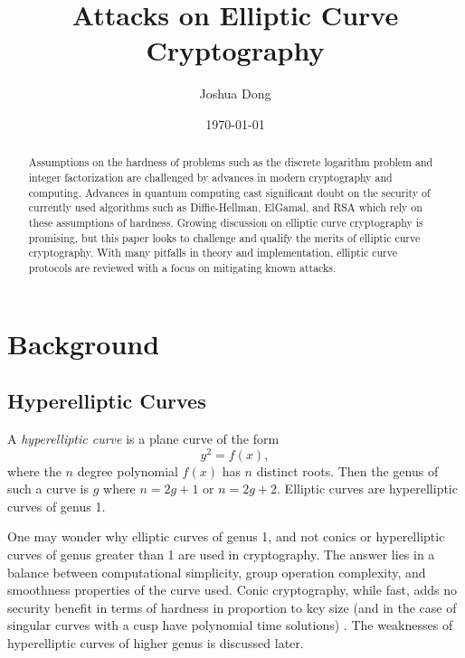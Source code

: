 \documentclass{article}
\begin{document}
\title{Attacks on Elliptic Curve Cryptography}
\author{Joshua Dong}
\date{\today}
\maketitle

\begin{abstract}
    Assumptions on the hardness of problems such as the discrete logarithm
    problem and integer factorization are challenged by advances in modern
    cryptography and computing. Advances in quantum computing cast significant
    doubt on the security of currently used algorithms such as Diffie-Hellman,
    ElGamal, and RSA which rely on these assumptions of hardness. Growing
    discussion on elliptic curve cryptography is promising, but this paper
    looks to challenge and qualify the merits of elliptic curve cryptography.
    With many pitfalls in theory and implementation, elliptic curve protocols
    are reviewed with a focus on mitigating known attacks.
\end{abstract}
 

\section{Background}
\subsection{Hyperelliptic Curves}
    A \textit{hyperelliptic curve} is a plane curve of the form
    \begin{equation}
        y^2 = f(x),
    \end{equation}
    where the $n$ degree polynomial $f(x)$ has $n$ distinct roots. Then the
    genus of such a curve is $g$ where $n = 2g + 1$ or $n = 2g + 2$. Elliptic
    curves are hyperelliptic curves of genus 1.

    One may wonder why elliptic curves of genus 1, and not conics or
    hyperelliptic curves of genus greater than 1 are used in cryptography. The
    answer lies in a balance between computational simplicity, group operation
    complexity, and smoothness properties of the curve used. Conic
    cryptography, while fast, adds no security benefit in terms of hardness in
    proportion to key size (and in the case of singular curves with a cusp have
    polynomial time solutions) \cite{Menezes1992}. The weaknesses of
    hyperelliptic curves of higher genus is discussed later.
\end{document}
